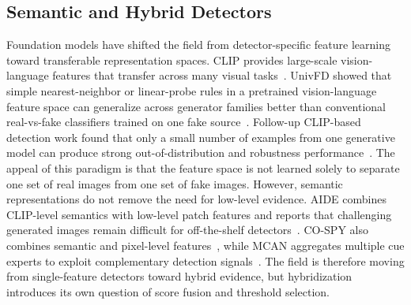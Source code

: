 \documentclass[lettersize,journal]{IEEEtran}
\begin{document}
\subsection{Semantic and Hybrid Detectors}
Foundation models have shifted the field from detector-specific feature learning toward transferable representation spaces. CLIP provides large-scale vision-language features that transfer across many visual tasks~\cite{radford2021clip}. UnivFD showed that simple nearest-neighbor or linear-probe rules in a pretrained vision-language feature space can generalize across generator families better than conventional real-vs-fake classifiers trained on one fake source~\cite{ojha2023univfd}. Follow-up CLIP-based detection work found that only a small number of examples from one generative model can produce strong out-of-distribution and robustness performance~\cite{cozzolino2024clip}. The appeal of this paradigm is that the feature space is not learned solely to separate one set of real images from one set of fake images. However, semantic representations do not remove the need for low-level evidence. AIDE combines CLIP-level semantics with low-level patch features and reports that challenging generated images remain difficult for off-the-shelf detectors~\cite{yan2025aide}. CO-SPY also combines semantic and pixel-level features~\cite{cheng2025cospy}, while MCAN aggregates multiple cue experts to exploit complementary detection signals~\cite{tan2026mcan}. The field is therefore moving from single-feature detectors toward hybrid evidence, but hybridization introduces its own question of score fusion and threshold selection.
\end{document}
